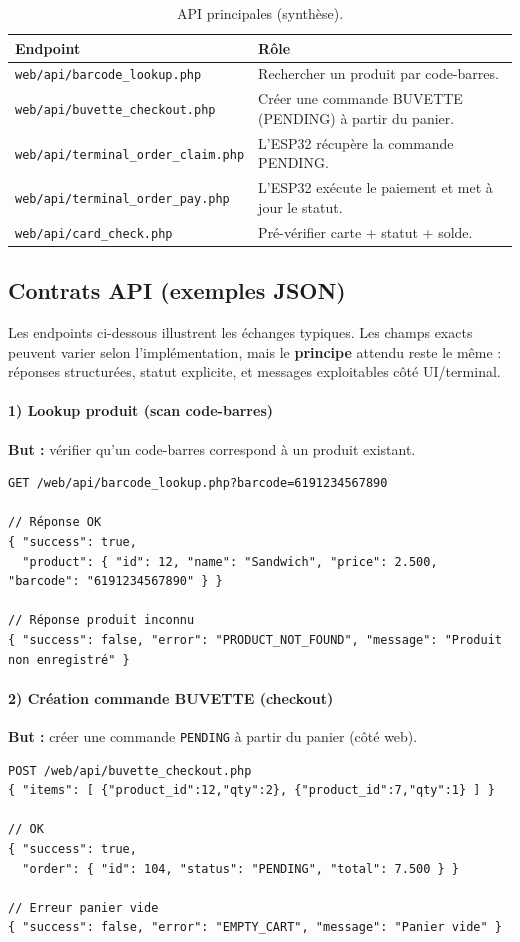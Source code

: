 \documentclass[12pt,a4paper]{report}
\begin{document}
\begin{table}[H]
\centering
\begin{tabular}{p{} p{}}
\toprule
\textbf{Endpoint} & \textbf{Rôle}\\
\midrule
\texttt{web/api/barcode\_lookup.php} & Rechercher un produit par code-barres.\\
\texttt{web/api/buvette\_checkout.php} & Créer une commande BUVETTE (PENDING) à partir du panier.\\
\texttt{web/api/terminal\_order\_claim.php} & L’ESP32 récupère la commande PENDING.\\
\texttt{web/api/terminal\_order\_pay.php} & L’ESP32 exécute le paiement et met à jour le statut.\\
\texttt{web/api/card\_check.php} & Pré-vérifier carte + statut + solde.\\
\bottomrule
\end{tabular}
\caption{API principales (synthèse).}
\end{table}

\subsection{Contrats API (exemples JSON)}
Les endpoints ci-dessous illustrent les échanges typiques. Les champs exacts peuvent varier selon l’implémentation, mais le \textbf{principe} attendu reste le même : réponses structurées, statut explicite, et messages exploitables côté UI/terminal.

\paragraph{1) Lookup produit (scan code-barres)}
\textbf{But :} vérifier qu’un code-barres correspond à un produit existant.
\begin{lstlisting}
GET /web/api/barcode_lookup.php?barcode=6191234567890

// Réponse OK
{ "success": true,
  "product": { "id": 12, "name": "Sandwich", "price": 2.500, "barcode": "6191234567890" } }

// Réponse produit inconnu
{ "success": false, "error": "PRODUCT_NOT_FOUND", "message": "Produit non enregistré" }
\end{lstlisting}

\paragraph{2) Création commande BUVETTE (checkout)}
\textbf{But :} créer une commande \texttt{PENDING} à partir du panier (côté web).
\begin{lstlisting}
POST /web/api/buvette_checkout.php
{ "items": [ {"product_id":12,"qty":2}, {"product_id":7,"qty":1} ] }

// OK
{ "success": true,
  "order": { "id": 104, "status": "PENDING", "total": 7.500 } }

// Erreur panier vide
{ "success": false, "error": "EMPTY_CART", "message": "Panier vide" }
\end{lstlisting}
\end{document}
